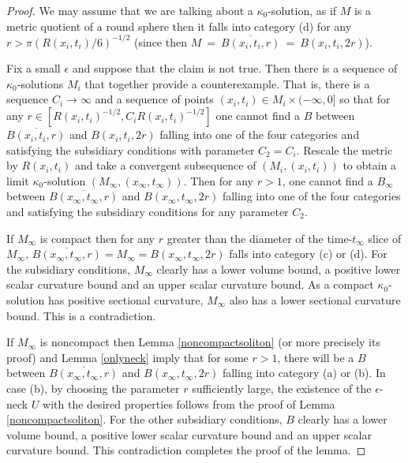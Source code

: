 \documentclass[12pt]{amsart}
\newcommand{\eps}{\epsilon}
\numberwithin{equation}{section}
\theoremstyle{plain}
\theoremstyle{definition}
\theoremstyle{remark}
\begin{document}
\begin{proof}
We may assume that we are talking about a 
$\kappa_0$-solution, as if $M$ is a metric quotient of a round sphere then
it falls into category (d) for any $r > \pi (R(x_i, t_i)/6)^{-1/2}$
(since then 
$M \: = \: \overline{B(x_i, t_i, r)} \: = \: B(x_i, t_i, 2r)$). 

Fix a small $\epsilon$ and suppose that the claim
is not true.  Then there is a sequence of $\kappa_0$-solutions $M_i$ that
together provide a counterexample.  That is, there is a sequence
$C_i \rightarrow \infty$ and a sequence of points $(x_i, t_i) \in
M_i \times (-\infty, 0]$ so that for any $r \in
[R(x_i, t_i)^{-1/2}, C_i R(x_i, t_i)^{-1/2} ]$ one cannot
find a $B$ between 
$\overline{B(x_i, t_i, r)}$
and $B(x_i, t_i, 2r)$ falling into
one of the four categories
and satisfying the subsidiary conditions with parameter $C_2 = C_i$.
Rescale the metric by $R(x_i, t_i)$ and take 
a convergent subsequence of 
$(M_i, (x_i, t_i))$ to obtain a limit $\kappa_0$-solution
$(M_\infty, (x_\infty, t_\infty))$. Then for any $r > 1$,
one cannot
find a $B_\infty$ between 
$\overline{B(x_\infty, t_\infty, r)}$
and 
$B(x_\infty, t_\infty, 2r)$ falling into
one of the four categories and satisfying the subsidiary conditions
for any parameter $C_2$.

If $M_\infty$ is compact then
for any $r$ greater than the diameter of the 
time-$t_\infty$ slice of $M_\infty$, 
$\overline{B(x_\infty, t_\infty, r)} = M_\infty = B(x_\infty, t_\infty, 2r)$
falls
into category (c) or (d). For the subsidiary conditions,
$M_\infty$ clearly has a lower volume bound, a positive lower
scalar curvature bound and an upper scalar
curvature bound. As a compact
$\kappa_0$-solution has positive sectional curvature, 
$M_\infty$ also has a lower sectional curvature bound. 
This is a contradiction.

If $M_\infty$ is noncompact then Lemma
\ref{noncompactsoliton} (or more precisely its proof) and 
Lemma \ref{onlyneck}
imply that for some $r>1$, there will be a $B$ between 
$\overline{B(x_\infty, t_\infty, r)}$
and $B(x_\infty, t_\infty, 2r)$
falling into category (a) or (b).
In case (b), by choosing the parameter $r$ sufficiently large,
the existence of the $\eps$-neck $U$
with the desired properties follows from the proof of 
Lemma \ref{noncompactsoliton}.
For the other subsidiary conditions,
$B$ clearly has a lower volume bound, a positive lower
scalar curvature bound and an upper scalar
curvature bound. 
This contradiction completes the proof of the lemma.
\end{proof}
\end{document}
